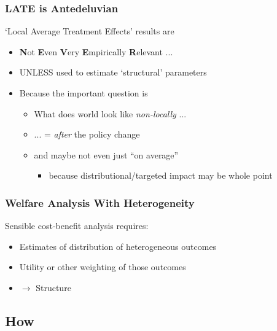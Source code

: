 \documentclass[public]{beamer}
\begin{document}
\begin{frame}
\frametitle{LATE is Antedeluvian}

`Local Average Treatment Effects' results are 
\begin{itemize}
  \item {\bf N}ot {\bf E}ven {\bf V}ery {\bf E}mpirically {\bf R}elevant ...
  \item UNLESS used to estimate `structural' parameters
\item Because the important question is
\begin{itemize}
\item What does world look like {\it non-locally} ...
\item ... = {\it after} the policy change
\item and maybe not even just ``on average''
\begin{itemize}
\item because distributional/targeted impact may be whole point
\end{itemize}
\end{itemize}

\end{itemize}

\end{frame}

\begin{frame}
\frametitle{Welfare Analysis With Heterogeneity}

Sensible cost-benefit analysis requires:
\begin{itemize}
\item Estimates of distribution of heterogeneous outcomes 
\item Utility or other weighting of those outcomes
\item $\rightarrow$ Structure
\end{itemize}

\end{frame}

\subsection{How}
\end{document}

